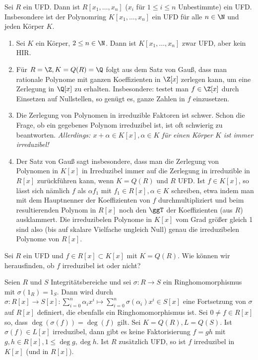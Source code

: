 \begin{kor} \label{15.3-9}
	Sei $R$ ein UFD.
	Dann ist $R[x_1, \dotsc, x_n]$ ($x_i$ für $1 \le i \le n$ Unbestimmte) ein UFD.
	Insbesondere ist der Polynomring $K[x_1, \dotsc, x_n]$ ein UFD für alle $n \in \N$ und jeden Körper $K$.
\end{kor}

\setcounter{thm}{10}
\begin{nt} \label{15.3-11}
	\begin{enumerate}[1)]
		\item
			Sei $K$ ein Körper, $2 \le n \in \N$.
			Dann ist $K[x_1, \dotsc, x_n]$ zwar UFD, aber kein HIR.
		\item
			Für $R = \Z, K = Q(R) = \Q$ folgt aus dem Satz von Gauß, dass man rationale Polynome mit ganzen Koeffizienten in $\Z[x]$ zerlegen kann, um eine Zerlegung in $\Q[x]$ zu erhalten.
			Insbesondere: testet man $f \in \Z[x]$ durch Einsetzen auf Nullstellen, so genügt es, ganze Zahlen in $f$ einzusetzen.
		\item
			Die Zerlegung von Polynomen in irreduzible Faktoren ist schwer.
			Schon die Frage, ob ein gegebenes Polynom irreduzibel ist, ist oft schwierig zu beantworten.
			\emph{Allerdings: $x + \alpha \in K[x], \alpha \in K$ für einen Körper $K$ ist immer irreduzibel!}
		\item
			Der Satz von Gauß sagt insbesondere, dass man die Zerlegung von Polynomen in $K[x]$ in Irreduzibel immer auf die Zerlegung in irreduzible in $R[x]$ zurückführen kann, wenn $K = Q(R)$ und $R$ UFD.
			Ist $f \in K[x]$, so lässt sich nämlich $f$ als $\alpha f_1$ mit $f_1 \in R[x], \alpha \in K$ schreiben, etwa indem man mit dem Hauptnenner der Koeffizienten von $f$ durchmultipliziert und beim resultierenden Polynom in $R[x]$ noch den $\ggT$ der Koeffizienten (aus $R$) ausklammert.
			Die irreduzibelen Polynome in $K[x]$ vom Grad größer gleich 1 sind also (bis auf skalare Vielfache ungleich Null) genau die irreduzibelen Polynome von $R[x]$.
	\end{enumerate}
\end{nt}

Sei $R$ ein UFD und $f \in R[x] \subset K[x]$ mit $K = Q(R)$.
Wie können wir herausfinden, ob $f$ irreduzibel ist oder nicht?

\begin{st}[Reduktionskriterium] \label{15.3-12}
	Seien $R$ und $S$ Integritätsbereiche und sei $\sigma: R \to S$ ein Ringhomomorphismus mit $\sigma(1_R) = 1_S$.
	Dann wird durch $\sigma: R[x] \to S[x] : \sum_{i=0}^n \alpha_i x^i \mapsto \sum_{i=0}^n \sigma(\alpha_i) x^i \in S[x]$ eine Fortsetzung von $\sigma$ auf $R[x]$ definiert, die ebenfalls ein Ringhomomorphismus ist.
	Sei $0 \neq f \in R[x]$ so, dass $\deg(\sigma(f)) = \deg(f)$ gilt.
	Sei $K = Q(R), L = Q(S)$.
	Ist $\sigma(f) \in L[x]$ irreduzibel, dann gibt es keine Faktorisierung $f = gh$ mit $g, h \in R[x], 1 \le \deg g, \deg h$.
	Ist $R$ zusätzlich UFD, so ist $f$ irreduzibel in $K[x]$ (und in $R[x]$).
\end{st}

